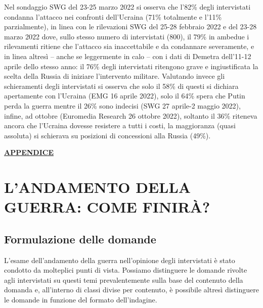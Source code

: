 \documentclass[
  openany]{book}
\begin{document}
Nel sondaggio SWG del 23-25 marzo 2022 si osserva che l'82\% degli intervistati condanna l'attacco nei confronti dell'Ucraina (71\% totalmente e l'11\% parzialmente), in linea con le rilevazioni SWG del 25-28 febbraio 2022 e del 23-28 marzo 2022 dove, sullo stesso numero di intervistati (800), il 79\% in ambedue i rilevamenti ritiene che l'attacco sia inaccettabile e da condannare severamente, e in linea altresì -- anche se leggermente in calo -- con i dati di Demetra dell'11-12 aprile dello stesso anno: il 76\% degli intervistati ritengono grave e ingiustificata la scelta della Russia di iniziare l'intervento militare. Valutando invece gli schieramenti degli intervistati si osserva che solo il 58\% di questi si dichiara apertamente con l'Ucraina (EMG 16 aprile 2022), solo il 64\% spera che Putin perda la guerra mentre il 26\% sono indecisi (SWG 27 aprile-2 maggio 2022), infine, ad ottobre (Euromedia Research 26 ottobre 2022), soltanto il 36\% riteneva ancora che l'Ucraina dovesse resistere a tutti i costi, la maggioranza (quasi assoluta) si schierava su posizioni di concessioni alla Russia (49\%).

\href{https://github.com/LucianaFazio/Ucrania/blob/main/PDF_Appendice/III.\%20Le\%20cause\%20della\%20guerra_v.5.pdf}{\textbf{APPENDICE}}

\hypertarget{landamento-della-guerra-come-finiruxe0}{%
\chapter{L'ANDAMENTO DELLA GUERRA: COME FINIRÀ?}\label{landamento-della-guerra-come-finiruxe0}}

\hypertarget{formulazione-delle-domande-2}{%
\section{Formulazione delle domande}\label{formulazione-delle-domande-2}}

L'esame dell'andamento della guerra nell'opinione degli intervistati è stato condotto da molteplici punti di vista. Possiamo distinguere le domande rivolte agli intervistati su questi temi prevalentemente sulla base del contenuto della domanda e, all'interno di classi divise per contenuto, è possibile altresì distinguere le domande in funzione del formato dell'indagine.
\end{document}
